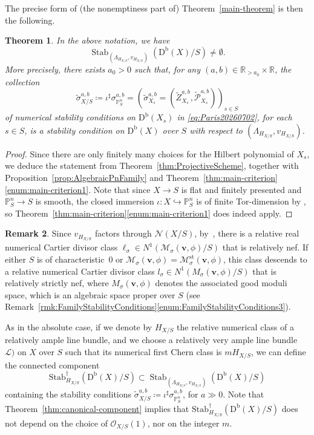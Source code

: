 \documentclass[11pt, reqno]{amsart}
\numberwithin{equation}{section}
\theoremstyle{plain}
\newtheorem{theorem}{Theorem}[section]
\theoremstyle{remark}
\theoremstyle{definition}
\newtheorem{remark}[theorem]{Remark}
\theoremstyle{italicsname}
\newcommand{\bv}{\mathbf{v}}
\newcommand{\Db}{\mathrm{D^b}}
\DeclareMathOperator{\Stab}{Stab}
\newcommand{\Stabdagger}{\mathrm{Stab}^\dagger}
\newcommand{\cO}{\mathcal{O}}
\newcommand{\cL}{\mathcal{L}}
\newcommand{\cM}{\mathcal{M}}
\newcommand{\cN}{\mathcal{N}}
\newcommand{\cP}{\mathscr{P}}
\def\RR{\ensuremath{\mathbb{R}}}
\def\PP{\ensuremath{\mathbb{P}}}
\begin{document}
The precise form of (the nonemptiness part of) Theorem~\ref{main-theorem} is then the following.

\begin{theorem}\label{thm:MainSecondVersion}
In the above notation, we have
\[
\Stab_{\left(\Lambda_{H_{X/S}},v_{H_{X/S}}\right)}(\Db(X)/S)\neq\emptyset.
\]
More precisely, there exists $a_0>0$ such that, for any $(a,b)\in\RR_{>a_0}\times\RR$, the collection 
\[
{\widetilde{\sigma}}^{a,b}_{X/S}\coloneqq\iota^\sharp{\sigma}^{a,b}_{\PP^n_S}=\left(\widetilde{\sigma}_{X_s}^{a,b}=\left(\widetilde{Z}^{a,b}_{X_s},\widetilde{\cP}_{X_s}^{a,b}\right)\right)_{s\in S}
\]
of numerical stability conditions on $\Db(X_s)$ in \eqref{eq:Paris20260702}, for each $s\in S$, is a stability condition on $\Db(X)$ over $S$ with respect to $(\Lambda_{H_{X/S}},v_{H_{X/S}})$.
\end{theorem}

\begin{proof}
Since there are only finitely many choices for the Hilbert polynomial of $X_s$, we deduce the statement from Theorem~\ref{thm:ProjectiveScheme}, together with Proposition~\ref{prop:AlgebraicPnFamily} and Theorem~\ref{thm:main-criterion}\ref{enum:main-criterion1}. 
Note that since $X \to S$ is flat and finitely presented and $\PP^n_S \to S$ is smooth, the closed immersion $\iota \colon X \hookrightarrow \PP^n_S$ is of finite Tor-dimension by \cite[\href{https://stacks.math.columbia.edu/tag/068D}{Tag 068D}]{stacks-project}, so Theorem~\ref{thm:main-criterion}\ref{enum:main-criterion1} does indeed apply. 
\end{proof}

\begin{remark}\label{rmk:LineBundle}
Since $v_{H_{X/S}}$ factors through $\cN(X/S)$, by~\cite[Theorem 21.25]{stability-families}, there is a relative real numerical Cartier divisor class $\ell_{{\sigma}}\in N^1(\cM_{{\sigma}}(\bv,\phi)/S)$ that
is relatively nef.
If either $S$ is of characteristic~$0$ or $\cM_{{\sigma}}(\bv,\phi)=\cM_{{\sigma}}^{\mathrm{st}}(\bv,\phi)$, this class descends to a relative numerical Cartier divisor class $l_{{\sigma}}\in N^1(M_{{\sigma}}(\bv,\phi)/S)$ that is relatively strictly nef, where 
$M_{{\sigma}}(\bv,\phi)$ denotes the associated good moduli space, which is an algebraic space proper over $S$ (see Remark~\ref{rmk:FamilyStabilityConditions}\eqref{enum:FamilyStabilityConditions3}).
\end{remark}

As in the absolute case, if we denote by $H_{X/S}$ the relative numerical class of a relatively ample line bundle, and we choose a relatively very ample line bundle $\cL)$ on $X$ over $S$ such that its numerical first Chern class is $mH_{X/S}$, we can define the connected component
\[
\Stabdagger_{H_{X/S}}(\Db(X)/S)\subset\Stab_{\left(\Lambda_{H_{X/S}},v_{H_{X/S}}\right)}(\Db(X)/S)
\]
containing the stability conditions $\widetilde{{\sigma}}^{a,b}_{X/S}\coloneqq\iota^\sharp{\sigma}^{a,b}_{\PP^n_S}$, for $a\gg0$. Note that Theorem~\ref{thm:canonical-component} implies that $\Stabdagger_{H_{X/S}}(\Db(X)/S)$ does not depend on the choice of $\cO_{X/S}(1)$, nor on the integer $m$.
\end{document}
